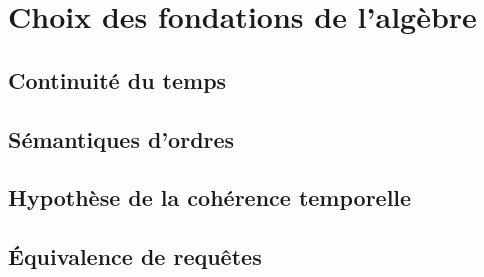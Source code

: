 \section{Choix des fondations de l'algèbre}
\subsection{Continuité du temps}
\subsection{Sémantiques d'ordres}
\subsection{Hypothèse de la cohérence temporelle}
\subsection{Équivalence de requêtes}